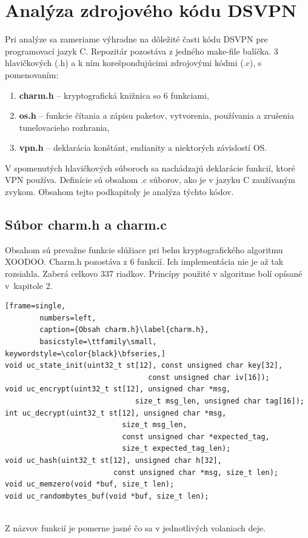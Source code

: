  
\section{Analýza zdrojového kódu DSVPN}
Pri analýze sa zameriame výhradne na dôležité časti kódu DSVPN pre programovací jazyk C. Repozitár pozostáva z jedného make-file balíčka\cite{make}. 3 hlavičkových (.h) a k ním korešpondujúcimi zdrojovými kódmi (.c), s pomenovaním:
 \begin{enumerate}
 	\item \textbf{charm.h} -- kryptografická knižnica so 6 funkciami,
 	\item \textbf{os.h} -- funkcie čítania a zápisu paketov, vytvorenia, používania a zrušenia tunelovacieho rozhrania,
 	\item \textbf{vpn.h} -- deklarácia konštánt, endianity\cite{endianita} a niektorých závislostí OS.
 \end{enumerate}

V spomenutých hlavičkových súboroch sa nachádzajú deklarácie funkcií, ktoré VPN používa. Definície sú obsahom .c súborov, ako je v jazyku C zaužívaným zvykom. Obsahom tejto podkapitoly je analýza týchto kódov. 
 
\subsection{Súbor charm.h a charm.c}
Obsahom sú prevažne funkcie slúžiace pri behu kryptografického algoritmu XOODOO. Charm.h pozostáva z 6 funkcií. Ich implementácia nie je až tak rozsiahla. Zaberá celkovo 337 riadkov. Princípy použité v algoritme bolí opísané v~kapitole 2.  
 
   \begin{minipage}{\linewidth} 	
  	\begin{lstlisting}[frame=single,
  		numbers=left,
  		caption={Obsah charm.h}\label{charm.h},
  		basicstyle=\ttfamily\small, keywordstyle=\color{black}\bfseries,]
void uc_state_init(uint32_t st[12], const unsigned char key[32], 
				  			 	 const unsigned char iv[16]);
void uc_encrypt(uint32_t st[12], unsigned char *msg, 
							  size_t msg_len, unsigned char tag[16]);	
int uc_decrypt(uint32_t st[12], unsigned char *msg, 
			   			   size_t msg_len,
			   			   const unsigned char *expected_tag, 
			   			   size_t expected_tag_len);
void uc_hash(uint32_t st[12], unsigned char h[32],
			 			 const unsigned char *msg, size_t len);
void uc_memzero(void *buf, size_t len);
void uc_randombytes_buf(void *buf, size_t len);
  		 	\end{lstlisting}
  	\end{minipage}\\
Z názvov funkcií je pomerne jasné čo sa v jednotlivých volaniach deje.   
